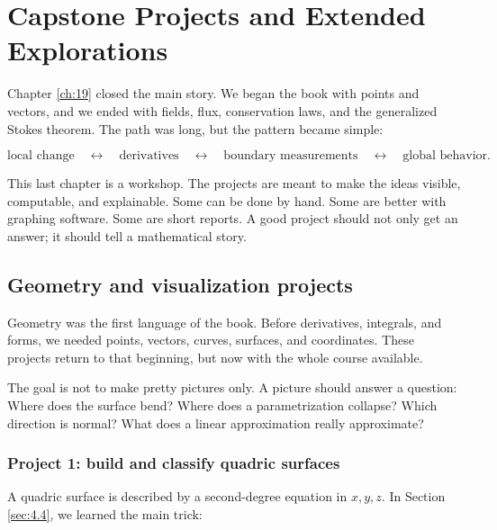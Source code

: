 
\chapter{Capstone Projects and Extended Explorations}
\label{ch:20}

Chapter \ref{ch:19} closed the main story.  We began the book with points and
vectors, and we ended with fields, flux, conservation laws, and the generalized Stokes
theorem.  The path was long, but the pattern became simple:

\[
    \text{local change}
    \quad\longleftrightarrow\quad
    \text{derivatives}
    \quad\longleftrightarrow\quad
    \text{boundary measurements}
    \quad\longleftrightarrow\quad
    \text{global behavior}.
\]

This last chapter is a workshop.  The projects are meant to make the ideas visible,
computable, and explainable.  Some can be done by hand.  Some are better with
graphing software.  Some are short reports.  A good project should not only get an
answer; it should tell a mathematical story.

\section{Geometry and visualization projects}
\label{sec:20.1}

Geometry was the first language of the book.  Before derivatives, integrals, and forms,
we needed points, vectors, curves, surfaces, and coordinates.  These projects return to
that beginning, but now with the whole course available.

The goal is not to make pretty pictures only.  A picture should answer a question:
Where does the surface bend?  Where does a parametrization collapse?  Which direction
is normal?  What does a linear approximation really approximate?

\subsection{Project 1: build and classify quadric surfaces}

A quadric surface is described by a second-degree equation in \(x,y,z\).  In Section
\ref{sec:4.4}, we learned the main trick:

